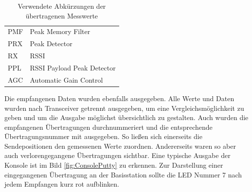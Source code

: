 \begin{table}[tbh]
	\centering
	\begin{tabular}{ll}
		
		PMF			&Peak Memory Filter\\
		PRX			&Peak Detector\\
		RX			&\acf{RSSI}\\
		PPL			&RSSI Payload Peak Detector\\
		AGC			&Automatic Gain Control\\
		
	\end{tabular}
	\caption{Verwendete Abkürzungen der übertragenen Messwerte}
	\label{tab:RSSI}
\end{table}
Die empfangenen Daten wurden ebenfalls ausgegeben. 
Alle Werte und Daten wurden nach Transceiver getrennt ausgegeben, um eine Vergleichsmöglichkeit zu geben und um die Ausgabe möglichst übersichtlich zu gestalten.
Auch wurden die empfangenen Übertragungen durchnummeriert und die entsprechende Übertragungsnummer mit ausgegeben. So ließen sich einerseits die Sendepositionen den gemessenen Werte zuordnen. Andererseits waren so aber auch  verlorengegangene  Übertragungen sichtbar. Eine typische Ausgabe der Konsole ist im Bild \ref{fig:ConsolePutty} zu erkennen. Zur Darstellung einer eingegangenen Übertragung an der Basisstation sollte die LED Nummer 7 nach jedem Empfangen kurz rot aufblinken. %



